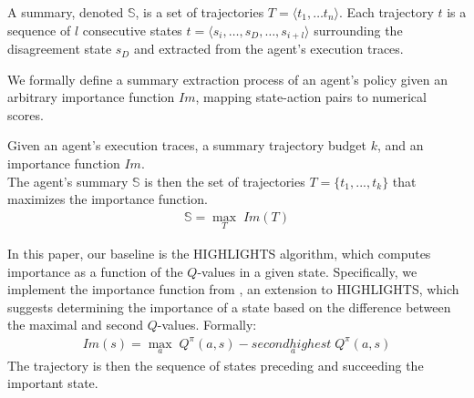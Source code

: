 A summary, denoted $\mathbb{S}$, is a set of trajectories $T = \langle t_1,\dots t_n \rangle$.
Each trajectory $t$ is a sequence of $l$ consecutive states $t =
\langle s_i, \dots, s_D, \dots, s_{i+l} \rangle$
surrounding the disagreement state $s_D$ and extracted from the agent's
execution traces. 

We formally define a summary extraction process of an agent's policy given an
arbitrary importance function $Im$, mapping state-action pairs to numerical
scores.


\begin{definition}
Given an agent's execution traces, a summary trajectory budget $k$, and an
importance function $Im$. \\
The agent's summary $\mathbb{S}$ is then the set of trajectories $T = \{
t_1,...,t_k \}$ that maximizes the importance function.
\begin{align}
    \mathbb{S} = \max_T \; Im(T)
\end{align}
\end{definition}
In this paper, our baseline is the HIGHLIGHTS algorithm, which computes
importance as a function of the $Q$-values in a given state. Specifically, we
implement the importance function from \citet{Tobias}, an extension to
HIGHLIGHTS, which suggests determining the importance of a state based on the
difference between the maximal and second $Q$-values.
Formally:
\begin{align}
   Im(s) = \max_a\; Q^\pi(a,s) - second\underset{a}highest\; Q^\pi(a,s)
\end{align}
The trajectory is then the sequence of states preceding and succeeding the
important state. 

